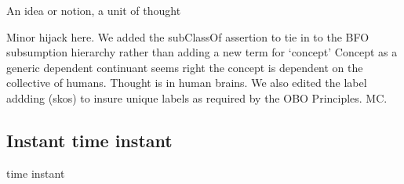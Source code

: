\documentclass[letterpaper,10pt,english]{sphinxmanual}
\begin{document}
\begin{sphinxShadowBox}

\sphinxAtStartPar
{\hyperref[\detokenize{doc-BFO_0000031::doc}]{}}
\end{sphinxShadowBox}

\begin{sphinxShadowBox}

\sphinxAtStartPar
An idea or notion, a unit of thought
\end{sphinxShadowBox}

\begin{sphinxShadowBox}

\sphinxAtStartPar
Minor hijack here.  We added the subClassOf assertion to tie in to the BFO subsumption hierarchy rather than adding a new term for ‘concept’
Concept as a generic dependent continuant seems right \textendash{} the concept is dependent on the collective of humans.  Thought is in human brains.
We also edited the label addding (skos) to insure unique labels as required by the OBO Principles. MC.
\end{sphinxShadowBox}
\begin{quote}

\ignorespaces \end{quote}


\subsection{Instant \sphinxhyphen{} time instant}
\label{\detokenize{doc-Instant:instant-time-instant}}\label{\detokenize{doc-Instant:index-0}}\label{\detokenize{doc-Instant::doc}}
\begin{sphinxShadowBox}

\sphinxAtStartPar
time instant
\end{sphinxShadowBox}

\begin{sphinxShadowBox}

\sphinxAtStartPar
{\hyperref[\detokenize{doc-BFO_0000148::doc}]{}}
\end{sphinxShadowBox}
\end{document}
